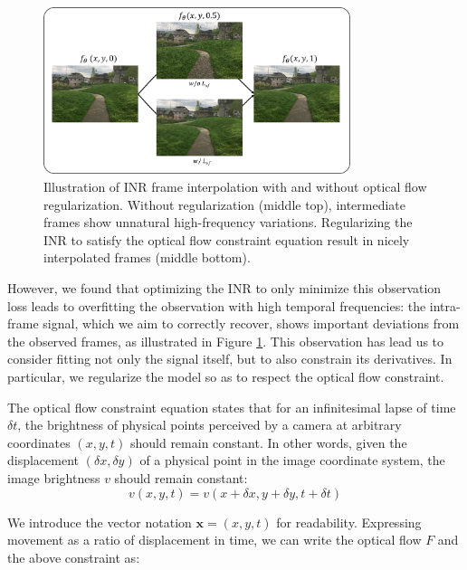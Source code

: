 \documentclass{article}
\begin{document}
\begin{figure}[t]
\centering
\includegraphics[width=0.8\textwidth]{"w_wo_OF"}
\caption{Illustration of INR frame interpolation with and without optical flow regularization.
Without regularization (middle top), intermediate frames show unnatural high-frequency variations.
Regularizing the INR to satisfy the optical flow constraint equation result in nicely interpolated frames (middle bottom).
}
\label{fig_w_wo_OF}
\end{figure}

However, we found that optimizing the INR to only minimize this observation loss leads to overfitting the observation with high temporal frequencies:
the intra-frame signal, which we aim to correctly recover, shows important deviations from the observed frames, as illustrated in Figure \ref{fig_w_wo_OF}.
This observation has lead us to consider fitting not only the signal itself, but to also constrain its derivatives.
In particular, we regularize the model so as to respect the optical flow constraint.


The optical flow constraint equation states that for an infinitesimal lapse of time $\delta t$,
the brightness of physical points perceived by a camera at arbitrary coordinates $(x,y,t)$ should remain constant.
In other words, given the displacement $(\delta x, \delta y)$ of a physical point in the image coordinate system,
the image brightness $v$ should remain constant:
\begin{equation}
v(x, y, t)=v(x + \delta x, y + \delta y, t + \delta t)
\end{equation}

We introduce the vector notation $\textbf{x}=(x,y,t)$ for readability.
Expressing movement as a ratio of displacement in time,
we can write the optical flow $F$ and the above constraint as:
\end{document}
